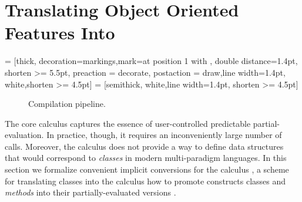 
\section{Translating Object Oriented Features Into \calculus}
\label{sct:scala-translation}
\usetikzlibrary{arrows, decorations.markings}
 = [thick, decoration={markings,mark=at position
   1 with {}},
   double distance=1.4pt, shorten >= 5.5pt,
   preaction = {decorate},
   postaction = {draw,line width=1.4pt, white,shorten >= 4.5pt}]
 = [semithick, white,line width=1.4pt, shorten >= 4.5pt]

\begin{figure}
\center
{}
\caption{Compilation pipeline.}
\label{fig:phases}
\end{figure}


The core calculus  captures the essence of user-controlled
 predictable partial-evaluation. In practice, though, it requires an inconveniently large number
 of  calls. Moreover, the calculus does not provide a way to define
 data structures that would correspond to \emph{classes} in modern multi-paradigm languages.
 In this section we formalize convenient implicit conversions for the calculus , a scheme for
 translating classes into the calculus how to promote constructs classes and \emph{methods} into their
 partially-evaluated versions .

